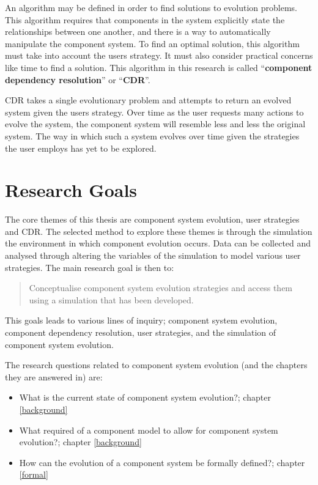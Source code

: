An algorithm may be defined in order to find solutions to evolution problems.
This algorithm requires that components in the system explicitly state the relationships between one another, and there is a way to automatically manipulate the component system.
To find an optimal solution, this algorithm must take into account the users strategy.
It must also consider practical concerns like time to find a solution.
This algorithm in this research is called ``\textbf{component dependency resolution}'' or ``\textbf{CDR}''.

CDR takes a single evolutionary problem and attempts to return an evolved system given the users strategy.
Over time as the user requests many actions to evolve the system, the component system will resemble less and less the original system.
The way in which such a system evolves over time given the strategies the user employs has yet to be explored. 

\section{Research Goals}
The core themes of this thesis are component system evolution, user strategies and CDR.
The selected method to explore these themes is through the simulation the environment in which component evolution occurs.
Data can be collected and analysed through altering the variables of the simulation to model various user strategies.
The main research goal is then to:
\begin{quote}
Conceptualise component system evolution strategies and access them using a simulation that has been developed.
\end{quote}

This goals leads to various lines of inquiry; component system evolution, component dependency resolution, user strategies, and the simulation of component system evolution.

The research questions related to component system evolution (and the chapters they are answered in) are:
\begin{itemize}
	\item What is the current state of component system evolution?; chapter \ref{background}
	\item What required of a component model to allow for component system evolution?; chapter \ref{background}
	\item How can the evolution of a component system be formally defined?; chapter \ref{formal}
\end{itemize}


